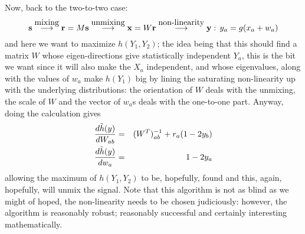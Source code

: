 \documentclass[12pt]{article}
\begin{document}
Now, back to the two-to-two case: 
\begin{equation}
{\bf s}\stackrel{\mbox{mixing}}{\longrightarrow}{\bf r}=M{\bf s}\stackrel{\mbox{unmixing}}{\longrightarrow}{\bf x}=W{\bf r}\stackrel{\mbox{non-linearity}}{\longrightarrow}{\bf y}:\,y_a=g(x_a+w_a)
\end{equation}
and here we want to maximize $h(Y_1,Y_2)$; the idea being that this
should find a matrix $W$ whose eigen-directions give statistically
independent $Y_a$, this is the bit we want since it will also make the
$X_a$ independent, and whose eigenvalues, along with the values of
$w_a$ make $h(Y_1)$ big by lining the saturating non-linearity up with
the underlying distributions: the orientation of $W$ deals with the
unmixing, the scale of $W$ and the vector of $w_a$s deals with the
one-to-one part. Anyway, doing the calculation gives 
\begin{eqnarray}
\frac{d\tilde{h}(y)}{dW_{ab}}&=&(W^T)^{-1}_{ab}+r_a(1-2y_b)\cr
\frac{d\tilde{h}(y)}{dw_a}&=&1-2y_a
\end{eqnarray}
allowing the maximum of $h(Y_1,Y_2)$ to be, hopefully, found and this,
again, hopefully, will unmix the signal. Note that this algorithm is
not as blind as we might of hoped, the non-linearity needs to be
chosen judiciously: however, the algorithm is reasonably robust;
reasonably successful and certainly interesting mathematically.


{}
\end{document}
